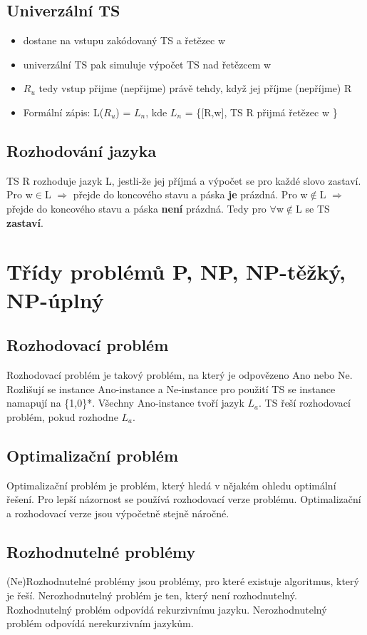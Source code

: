 \documentclass{szzclass}
\begin{document}
\subsection{Univerzální TS}
\begin{itemize}
\item dostane na vstupu zakódovaný TS a řetězec w
\item univerzální TS pak simuluje výpočet TS nad řetězcem w
\item$R_u$ tedy vstup přijme (nepřijme) právě tehdy, když jej příjme (nepříjme) R
\item Formální zápis: L($R_u$) = $L_n$, kde $L_n$ = \{[R,w], TS R přijmá řetězec w \}
\end{itemize}
\subsection{Rozhodování jazyka}
TS R rozhoduje jazyk L, jestli-že jej příjmá a výpočet se pro každé slovo zastaví.
\newline
Pro w$\in$L $\Rightarrow$ přejde do koncového stavu a páska \textbf{je} prázdná.
\newline
Pro w$\notin$L $\Rightarrow$ přejde do koncového stavu a páska \textbf{není} prázdná.
\newline
Tedy pro $\forall$w$\notin$L se TS \textbf{zastaví}.


\section{Třídy problémů P, NP, NP-těžký, NP-úplný}
\subsection{Rozhodovací problém}
Rozhodovací problém je takový problém, na který je odpovězeno Ano nebo Ne. Rozlišují se instance Ano-instance a Ne-instance
pro použití TS se instance namapují na \{1,0\}*. Všechny Ano-instance tvoří jazyk $L_a$. TS řeší rozhodovací problém, pokud rozhodne $L_a$.
\subsection{Optimalizační problém}
Optimalizační problém je problém, který hledá v nějakém ohledu optimální řešení. Pro lepší názornost se používá rozhodovací verze problému.
Optimalizační a rozhodovací verze jsou výpočetně stejně náročné.
\subsection{Rozhodnutelné problémy}
(Ne)Rozhodnutelné problémy jsou problémy, pro které existuje algoritmus, který je řeší. Nerozhodnutelný problém je ten, který není rozhodnutelný.
\newline
Rozhodnutelný problém odpovídá rekurzivnímu jazyku.
\newline
Nerozhodnutelný problém odpovídá nerekurzivním jazykům.
\end{document}
